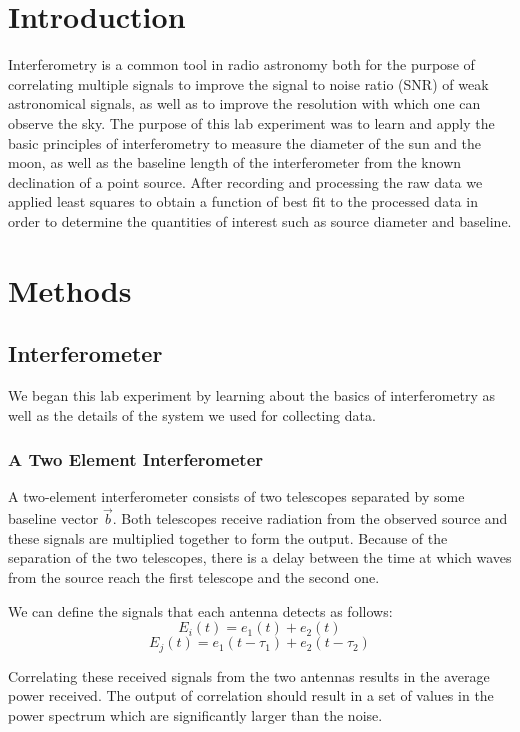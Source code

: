\documentclass{article}
\begin{document}
\section{Introduction}
Interferometry is a common tool in radio astronomy both for the purpose of
correlating multiple signals to improve the signal to noise ratio (SNR)
of weak astronomical signals, as well as to improve the resolution with which
one can observe the sky. The purpose of this lab experiment was to learn and
apply the basic principles of interferometry to measure the diameter of the sun
and the moon, as well as the baseline length of the interferometer from the
known declination of a point source. After recording and processing the raw data
we applied least squares to obtain a function of best fit to the processed data in order to determine the quantities of interest such as source diameter and
baseline.
\section{Methods}
  \subsection{Interferometer}
  We began this lab experiment by learning about the basics of interferometry as
  well as the details of the system we used for collecting data.

  \subsubsection{A Two Element Interferometer}
  A two-element interferometer consists of two telescopes separated by some
  baseline vector $\vec{b}$. Both telescopes receive radiation from the observed
  source and these signals are multiplied together to form the output. Because
  of the separation of the two telescopes, there is a delay between the time at
  which waves from the source reach the first telescope and the second one.

  We can define the signals that each antenna detects as follows:
  \[E_{i}(t) = e_{1}(t) + e_{2}(t)\]
  \[E_{j}(t) = e_{1}(t-\tau_{1}) + e_{2}(t-\tau_{2})\]

  Correlating these received signals from the two antennas results in the
  average power received. The output of correlation should result in a set of
  values in the power spectrum which are significantly larger than the noise.
\end{document}

